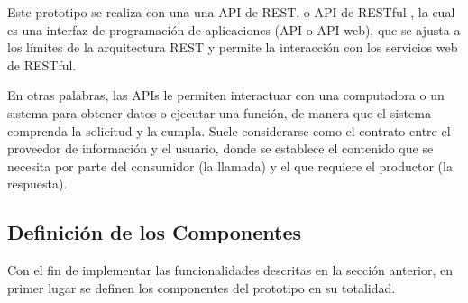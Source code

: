 Este prototipo se realiza con una una API de REST, o API de RESTful \cite{api}, la cual es una interfaz de programación de aplicaciones (API o API web), que se ajusta a los límites de la arquitectura REST y permite la interacción con los servicios web de RESTful.

En otras palabras, las APIs le permiten interactuar con una computadora o un sistema para obtener datos o ejecutar una función, de manera que el sistema comprenda la solicitud y la cumpla. Suele considerarse como el contrato entre el proveedor de información y el usuario, donde se establece el contenido que se necesita por parte del consumidor (la llamada) y el que requiere el productor (la respuesta). \\

\subsection{Definición de los Componentes}%

Con el fin de implementar las funcionalidades descritas en la sección anterior, en primer lugar se definen los componentes del prototipo en su totalidad.

